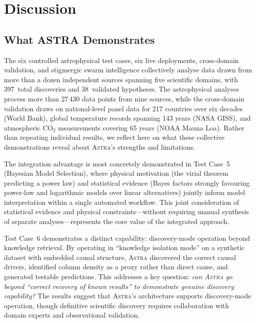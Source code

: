 \documentclass[usenatbib]{rasti}
\newcommand{\astra}{\textsc{Astra}\xspace}
\begin{document}
\section{Discussion}
\label{sec:discussion}

\subsection{What ASTRA Demonstrates}
\label{sec:discussion:demonstrates}

The six controlled astrophysical test cases, six live deployments, cross-domain validation, and stigmergic swarm intelligence collectively analyse data drawn from more than a dozen independent sources spanning five scientific domains, with 397~total discoveries and 38~validated hypotheses.
The astrophysical analyses process more than 27\,430 data points from nine sources, while the cross-domain validation draws on national-level panel data for 217 countries over six decades (World Bank), global temperature records spanning 143 years (NASA GISS), and atmospheric CO$_{2}$ measurements covering 65 years (NOAA Mauna Loa).
Rather than repeating individual results, we reflect here on what these collective demonstrations reveal about \astra's strengths and limitations.

The integration advantage is most concretely demonstrated in Test Case~5 (Bayesian Model Selection), where physical motivation (the virial theorem predicting a power law) and statistical evidence (Bayes factors strongly favouring power-law and logarithmic models over linear alternatives) jointly inform model interpretation within a single automated workflow.
This joint consideration of statistical evidence and physical constraints---without requiring manual synthesis of separate analyses---represents the core value of the integrated approach.

Test Case~6 demonstrates a distinct capability: discovery-mode operation beyond knowledge retrieval.
By operating in ``knowledge isolation mode'' on a synthetic dataset with embedded causal structure, \astra discovered the correct causal drivers, identified column density as a proxy rather than direct cause, and generated testable predictions.
This addresses a key question: \emph{can \astra go beyond ``correct recovery of known results'' to demonstrate genuine discovery capability?}
The results suggest that \astra's architecture supports discovery-mode operation, though definitive scientific discovery requires collaboration with domain experts and observational validation.
\end{document}
